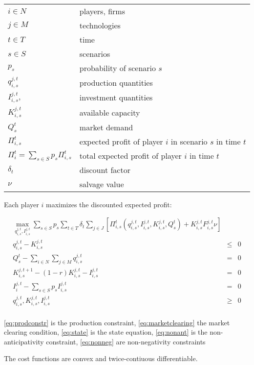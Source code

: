 \begin{longtable}[l]{l l}
$i \in N$ & players, firms \\
$j \in M$ & technologies \\
$t \in T$ & time \\
$s \in S$ & scenarios \\
$p_s$ & probability of scenario $s$\\
$ q_{i,s}^{j,t}$ & production quantities \\
$I_{i,s}^{j,t},$ & investment quantities \\
$K_{i,s}^{j,t}$ & available capacity\\
$Q_s^t$ & market demand \\
$\Pi_{i,s}^t$ & expected profit of player $i$ in scenario $s$ in time $t$\\
$\Pi_i^t = \sum_{s\in S}p_s\Pi_{i,s}^t$ & total expected profit of player $i$ in time $t$\\
$\delta_t$ & discount factor \\
$\nu$ & salvage value

\end{longtable}

Each player $i$ maximizes the discounted expected profit:

\begin{eqnarray}
  \label{eq:objfct}
  \max_{q_{i,s}^{j,t}, I_{i,s}^{j,t}} \sum_{s\in S}p_s \sum_{t\in T}\delta_t \sum_{j\in J}\left[\Pi_{i,s}^t\left(q_{i,s}^{j,t}, I_{i,s}^{j,t}, K_{i,s}^{j,t}, Q_s^t\right) + K_{i,s}^{j,t}F_{i,s}^{j,t}\nu\right ]\\
q_{i,s}^{j,t} - K_{i,s}^{j,t} &\leq& 0 \label{eq:prodconstr} \\
Q_s^t-\sum_{i\in N}\sum_{j\in M} q_{i,s}^{j,t} &=& 0 \label{eq:marketclearing}\\
K_{i,s}^{j,t+1} - (1-r)K_{i,s}^{j,t}-I_{i,s}^{j,t} &=& 0 \label{eq:state} \\
I_{i}^{j,t}-\sum_{s\in S}p_sI_{i,s}^{j,t} &=& 0 \label{eq:nonant}\\
q_{i,s}^{j,t}, K_{i,s}^{j,t}, I_{i,s}^{j,t}  &\geq& 0 \label{eq:nonneg} \\
\end{eqnarray}

\eqref{eq:prodconstr} is the production constraint, \eqref{eq:marketclearing} the market clearing condition, \eqref{eq:state} is the state equation, \eqref{eq:nonant} is the non-anticipativity constraint, \eqref{eq:nonneg} are non-negativity constraints

The cost functions are convex and twice-contiuous differentiable.

